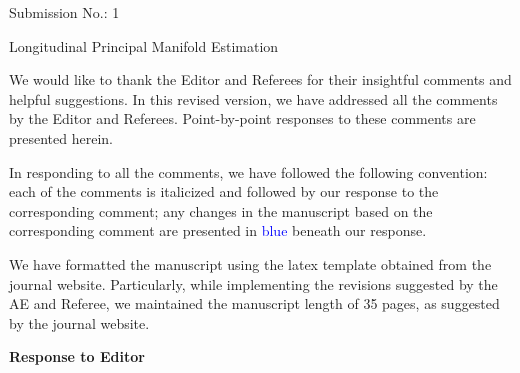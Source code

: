 \documentclass[12pt]{article}
\theoremstyle{definition}
\begin{document}
\begin{center}

{\large Submission No.: 1}

{\large \bigskip Longitudinal Principal Manifold Estimation}
\end{center}

\noindent We would like to thank the Editor and Referees for their insightful comments and helpful suggestions. In this revised version, we have addressed all the comments by the Editor and Referees. Point-by-point responses to these comments are presented herein. 

In responding to all the comments, we have followed the following convention: each of the comments is italicized and followed by our response to the corresponding comment; any changes in the manuscript based on the corresponding comment are presented in \textcolor{blue}{blue} beneath our response. 

We have formatted the manuscript using the latex template obtained from the journal website. Particularly, while implementing the revisions suggested by the AE and Referee, we maintained the manuscript length of 35 pages, as suggested by the journal website. 

\vspace{0.3in}


\large{\textbf{Response to Editor}}

\vspace{0.3in}
\end{document}
